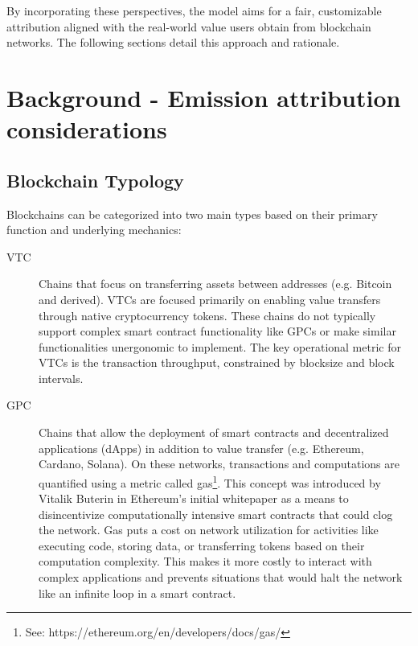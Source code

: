 \documentclass[11pt]{report}
\begin{document}
By incorporating these perspectives, the model aims for a fair, customizable attribution aligned with the real-world value users obtain from blockchain networks. The following sections detail this approach and rationale.

\section{Background - Emission attribution considerations}

\subsection{Blockchain Typology}
Blockchains can be categorized into two main types based on their primary function and underlying mechanics:

\begin{description}
    \item[\ac{VTC}] Chains that focus on transferring assets between addresses (e.g. Bitcoin and derived). VTCs are focused primarily on enabling value transfers through native cryptocurrency tokens. These chains do not typically support complex smart contract functionality like GPCs or make similar functionalities unergonomic to implement. The key operational metric for VTCs is the transaction throughput, constrained by blocksize and block intervals.

    \item[\ac{GPC}] Chains that allow the deployment of smart contracts and decentralized applications (dApps) in addition to value transfer (e.g. Ethereum, Cardano, Solana). On these networks, transactions and computations are quantified using a metric called gas\footnote{See: https://ethereum.org/en/developers/docs/gas/}. This concept was introduced by Vitalik Buterin in Ethereum's initial whitepaper \cite{buterinEthereumNextgenerationSmart} as a means to disincentivize computationally intensive smart contracts that could clog the network. Gas puts a cost on network utilization for activities like executing code, storing data, or transferring tokens based on their computation complexity. This makes it more costly to interact with complex applications and prevents situations that would halt the network like an infinite loop in a smart contract.
\end{description}
\end{document}
